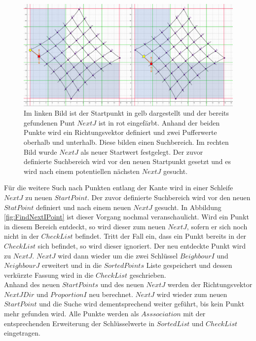 \begin{figure}[!htb]
	\centering
	\includegraphics[width=0.8\linewidth]{images/VerzeichnetesSchachbrett_4.png}
	\caption[Suche nach $NextJ$]{Im linken Bild ist der Startpunkt in gelb dargestellt und der bereits gefundenen Punt $NextJ$ ist in rot eingefärbt. Anhand der beiden Punkte wird ein Richtungsvektor definiert und zwei Pufferwerte oberhalb und unterhalb. Diese bilden einen Suchbereich. Im rechten Bild wurde $NextJ$ als neuer Startwert festgelegt. Der zuvor definierte Suchbereich wird vor den neuen Startpunkt gesetzt und es wird nach einem potentiellen nächsten $NextJ$ gesucht.}
	\label{fig:IListJList}
\end{figure}

Für die weitere Such nach Punkten entlang der Kante wird in einer Schleife $NextJ$ zu neuen $StartPoint$. Der zuvor definierte Suchbereich wird vor den neuen $StatPoint$ definiert und nach einem neuen $NextJ$ gesucht. In Abbildung \ref{fig:FindNextIPoint} ist dieser Vorgang nochmal veranschaulicht. Wird ein Punkt in diesem Bereich entdeckt, so wird dieser zum neuen $NextJ$, sofern er sich noch nicht in der $CheckList$ befindet. Tritt der Fall ein, dass ein Punkt bereits in der $CheckList$ sich befindet, so wird dieser ignoriert. Der neu entdeckte Punkt wird zu $NextJ$. $NextJ $ wird dann wieder um die zwei Schlüssel $BeighbourI$ und $NeighbourJ$ erweitert und in die $SortedPoints$ Liste gespeichert und dessen verkürzte Fassung wird in die $CheckList$ geschrieben.\\

%

Anhand des neuen $StartPoints$ und des neuen $NextJ$ werden der Richtungsvektor $NextJDir$ und $ProportionI$ neu berechnet. $NextJ$ wird wieder zum neuen $StartPoint$ und die Suche wird dementsprechend weiter geführt, bis kein Punkt mehr gefunden wird. Alle Punkte werden als $Asssociation$ mit der entsprechenden Erweiterung der Schlüsselwerte in $SortedList$ und $CheckList$ eingetragen.\\

